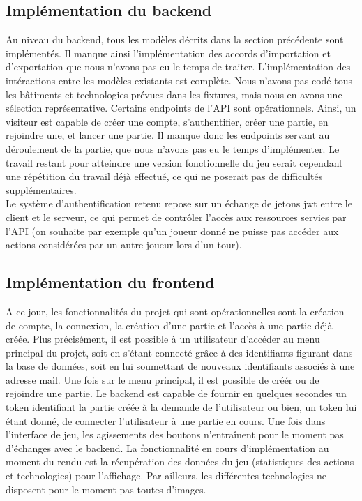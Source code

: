 \documentclass[12pt,twoside,a4paper]{article}
\begin{document}
\subsection{Impl\'ementation du backend}

Au niveau du backend, tous les mod\`eles d\'ecrits dans la section pr\'ec\'edente sont impl\'ement\'es. Il manque ainsi l'impl\'ementation des accords d'importation et d'exportation que nous n'avons pas eu le temps de traiter. L'impl\'ementation des int\'eractions entre les mod\`eles existants est compl\`ete. Nous n'avons pas cod\'e tous les b\^atiments et technologies pr\'evues dans les fixtures, mais nous en avons une s\'election repr\'esentative. Certains endpoints de l'API sont op\'erationnels. Ainsi, un visiteur est capable de créer une compte, s'authentifier, créer une partie, en rejoindre une, et lancer une partie. Il manque donc les endpoints servant au d\'eroulement de la partie, que nous n'avons pas eu le temps d'impl\'ementer. Le travail restant pour atteindre une version fonctionnelle du jeu serait cependant une répétition du travail déjà effectué, ce qui ne poserait pas de difficultés supplémentaires.\\
Le système d'authentification retenu repose sur un \'echange de jetons jwt entre le client et le serveur, ce qui permet de contrôler l'accès aux ressources servies par l'API (on souhaite par exemple qu'un joueur donné ne puisse pas accéder aux actions considérées par un autre joueur lors d'un tour). 

\subsection{Impl\'ementation du frontend}

A ce jour, les fonctionnalités du projet qui sont opérationnelles sont la création de compte, la connexion, la création d'une partie et l'accès à une partie déjà créée.
Plus précisément, il est possible à un utilisateur d'accéder au menu principal du projet, soit en s'étant connecté grâce à des identifiants figurant dans la base de données, soit en lui soumettant de nouveaux identifiants associés à une adresse mail. Une fois sur le menu principal, il est possible de créér ou de rejoindre une partie. Le backend est capable de fournir en quelques secondes un token identifiant la partie créée à la demande de l'utilisateur ou bien, un token lui étant donné, de connecter l'utilisateur à une partie en cours. 
Une fois dans l'interface de jeu, les agissements des boutons n'entraînent pour le moment pas d'échanges avec le backend. La fonctionnalité en cours d'implémentation au moment du rendu est la récupération des données du jeu (statistiques des actions et technologies) pour l'affichage. Par ailleurs, les différentes technologies ne disposent pour le moment pas toutes d'images.
\end{document}
